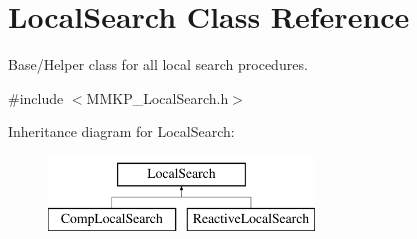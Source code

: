 \hypertarget{class_local_search}{\section{Local\+Search Class Reference}
\label{class_local_search}
}


Base/\+Helper class for all local search procedures.  




{\ttfamily \#include $<$M\+M\+K\+P\+\_\+\+Local\+Search.\+h$>$}

Inheritance diagram for Local\+Search\+:\begin{figure}[H]
\begin{center}
\leavevmode
\includegraphics[height=2.000000cm]{class_local_search}
\end{center}
\end{figure}

